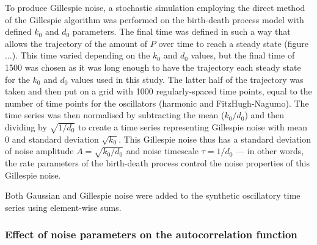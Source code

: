 To produce Gillespie noise, a stochastic simulation employing the direct method of the Gillespie algorithm was performed on the birth-death process model with defined $k_{0}$ and $d_{0}$ parameters.
The final time was defined in such a way that allows the trajectory of the amount of $P$ over time to reach a steady state (figure ...).
This time varied depending on the $k_{0}$ and $d_{0}$ values, but the final time of \num{1500} was chosen as it was long enough to have the trajectory each steady state for the $k_{0}$ and $d_{0}$ values used in this study.
The latter half of the trajectory was taken and then put on a grid with \num{1000} regularly-spaced time points, equal to the number of time points for the oscillators (harmonic and FitzHugh-Nagumo).
The time series was then normalised by subtracting the mean ($k_{0}/d_{0}$) and then dividing by $\sqrt{1/d_{0}}$ to create a time series representing Gillespie noise with mean 0 and standard deviation $\sqrt{k_{0}}$.
This Gillespie noise thus has a standard deviation of noise amplitude $A = \sqrt{k_{0}/d_{0}}$ and noise timescale $\tau = 1/d_{0}$ --- in other words, the rate parameters of the birth-death process control the noise properties of this Gillespie noise.

Both Gaussian and Gillespie noise were added to the synthetic oscillatory time series using element-wise sums.

\subsubsection{Effect of noise parameters on the autocorrelation function}
\label{subsubsec:analysis-characterisation-acf-sinusoid}

